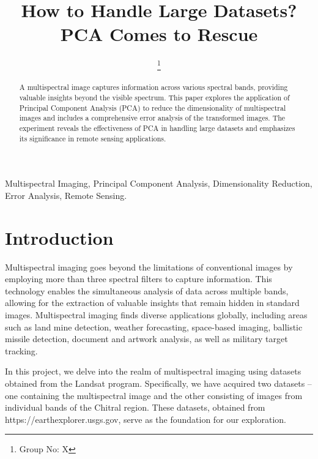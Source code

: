 \documentclass[conference]{IEEEtran}
\begin{document}
\title{How to Handle Large Datasets? PCA Comes to Rescue}
\author{
    \thanks{Group No: X} %
}

\maketitle

\begin{abstract}
A multispectral image captures information across various spectral bands, providing valuable insights beyond the visible spectrum. This paper explores the application of Principal Component Analysis (PCA) to reduce the dimensionality of multispectral images and includes a comprehensive error analysis of the transformed images. The experiment reveals the effectiveness of PCA in handling large datasets and emphasizes its significance in remote sensing applications.
\end{abstract}

\begin{IEEEkeywords}
Multispectral Imaging, Principal Component Analysis, Dimensionality Reduction, Error Analysis, Remote Sensing.
\end{IEEEkeywords}

\section{Introduction}
Multispectral imaging goes beyond the limitations of conventional images by employing more than three spectral filters to capture information. This technology enables the simultaneous analysis of data across multiple bands, allowing for the extraction of valuable insights that remain hidden in standard images. Multispectral imaging finds diverse applications globally, including areas such as land mine detection, weather forecasting, space-based imaging, ballistic missile detection, document and artwork analysis, as well as military target tracking.

In this project, we delve into the realm of multispectral imaging using datasets obtained from the Landsat program. Specifically, we have acquired two datasets – one containing the multispectral image and the other consisting of images from individual bands of the Chitral region. These datasets, obtained from https://earthexplorer.usgs.gov, serve as the foundation for our exploration.
\end{document}
